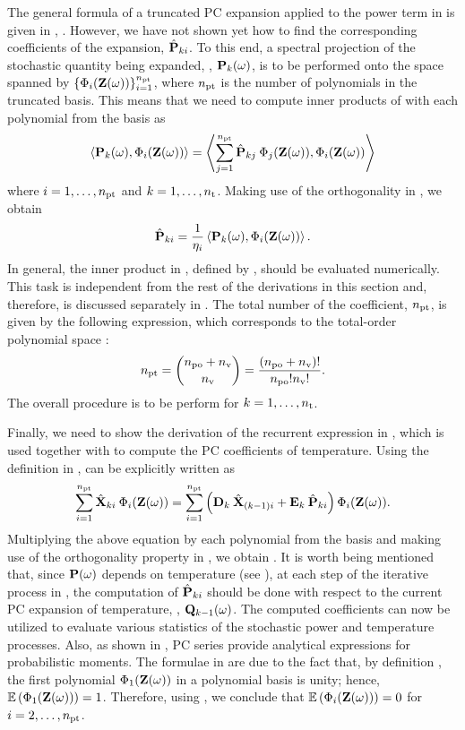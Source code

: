 The general formula of a truncated PC expansion applied to the power term in  is given in , .
However, we have not shown yet how to find the corresponding coefficients of the expansion, $\hat{\mathbf{P}}_{ki}$.
To this end, a spectral projection of the stochastic quantity being expanded, \ie, $\mathbf{P}_k(\omega)$, is to be performed onto the space spanned by $\{ \Phi_i(\mathbf{Z}(\omega)) \}_{i = 1}^{{n_\text{pt}}}$, where ${n_\text{pt}}$ is the number of polynomials in the truncated basis.
This means that we need to compute inner products of  with each polynomial from the basis as
\[
  \oInner{\vP_k(\o)}{\pcb_i(\vZ(\o))} = \oInner{\sum_{j=1}^{\pcterms} \pcc{\vP}_{kj} \: \pcb_j(\vZ(\o))}{\pcb_i(\vZ(\o))}
\]
where $i = 1, \dotsc, {n_\text{pt}}$ and $k = 1, \dotsc, {n_\text{t}}$.
Making use of the orthogonality in , we obtain
\begin{equation} \elabel{pc-coefficients}
  \pcc{\vP}_{ki} = \frac{1}{\pcn_i} \oInner{\vP_k(\o)}{\pcb_i(\vZ(\o))}.
\end{equation}
In general, the inner product in , defined by , should be evaluated numerically.
This task is independent from the rest of the derivations in this section and, therefore, is discussed separately in .
The total number of the coefficient, ${n_\text{pt}}$, is given by the following expression, which corresponds to the total-order polynomial space \cite{eldred2008, beck2011}:
\begin{equation} \elabel{pc-terms}
  \pcterms = { \pcorder + \nvars \choose \nvars } = \frac{(\pcorder + \nvars)!}{\pcorder! \nvars!}.
\end{equation}
The overall procedure is to be perform for $k = 1, \dotsc, {n_\text{t}}$.

Finally, we need to show the derivation of the recurrent expression in , which is used together with  to compute the PC coefficients of temperature. Using the definition in ,  can be explicitly written as
\[
  \sum_{i = 1}^{\pcterms} \pcc{\vX}_{ki} \: \pcb_i(\vZ(\o)) = \sum_{i = 1}^{\pcterms} \left( \mCF_k \: \pcc{\vX}_{(k - 1)i} + \mCS_k \: \pcc{\vP}_{ki} \right) \pcb_i(\vZ(\o)).
\]
Multiplying the above equation by each polynomial from the basis and making use of the orthogonality property in , we obtain .
It is worth being mentioned that, since $\mathbf{P}(\omega)$ depends on temperature (see ), at each step of the iterative process in , the computation of $\hat{\mathbf{P}}_{ki}$ should be done with respect to the current PC expansion of temperature, \ie, $\mathbf{Q}_{k - 1}(\omega)$.
The computed coefficients can now be utilized to evaluate various statistics of the stochastic power and temperature processes.
Also, as shown in , PC series provide analytical expressions for probabilistic moments.
The formulae in  are due to the fact that, by definition \cite{xiu2010}, the first polynomial $\Phi_1(\mathbf{Z}(\omega))$ in a polynomial basis is unity; hence, $\mathbb{E}\left(\Phi_1(\mathbf{Z}(\omega))\right) = 1$.
Therefore, using , we conclude that $\mathbb{E}\left(\Phi_i(\mathbf{Z}(\omega))\right) = 0$ for $i = 2, \dotsc, {n_\text{pt}}$.

